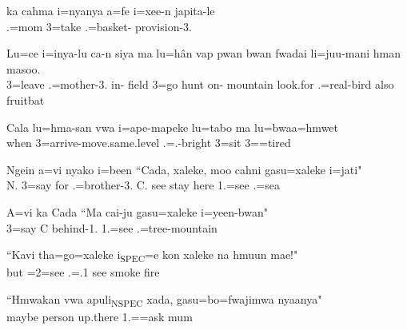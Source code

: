 \ea
\gll ka cahma i=nyanya a=fe i=xee-n japita-le\\   .=mom 3=take .=basket- provision-3.\\ \glt {}
\z
 
\ea
\gll Lu=ce i=inya-lu ca-n siya ma lu=hân vap pwan bwan fwadai li=juu-mani hman masoo.\\ 3=leave .=mother-3. in- field  3=go hunt on- mountain look.for .=real-bird also fruitbat\\ \glt  {}
\z

\ea
\gll Cala lu=hma-san vwa i=ape-mapeke lu=tabo ma lu=bwaa=hmwet\\ when 3=arrive-move.same.level  .=.-bright 3=sit  3==tired\\ \glt {} 
\z

\ea
\gll Ngein a=vi nyako i=been ``Cada, xaleke, moo cahni gasu=xaleke i=jati"\\ N. 3=say for .=brother-3. C. see stay here 1.=see .=sea\\ \glt {}
\z


\ea
\gll A=vi ka Cada ``Ma cai-ju gasu=xaleke i=yeen-bwan"\\ 3=say  C  behind-1. 1.=see .=tree-mountain\\ \glt {}
\z


\ea
\gll 	``Kavi tha=go=xaleke i\textsubscript{{\upshape SPEC}}={\ob}e kon xaleke{\cb} na hmuun mae!"\\	but =2=see .=.1  see  smoke fire	\\ \glt  {}		
\z 

\ea
\gll 	``Hmwakan vwa apuli\textsubscript{{\upshape NSPEC}} xada, gasu=bo=fwajimwa nyaanya"\\	maybe  person up.there 1.==ask mum	\\ \glt  {}	
\z 

